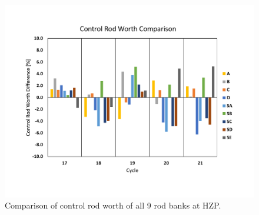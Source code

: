 \documentclass[edeposit,fullpage,11pt]{uiucthesis2009}
\begin{document}
\begin{figure}
\begin{center}
\includegraphics[trim={0 2cm 0 2cm},clip,width=0.85\linewidth]{./Figures/crw_diff.pdf}
\end{center}
\caption{Comparison of control rod worth of all 9 rod banks at HZP.}
\label{fig:crw}
\end{figure} 
\end{document}
